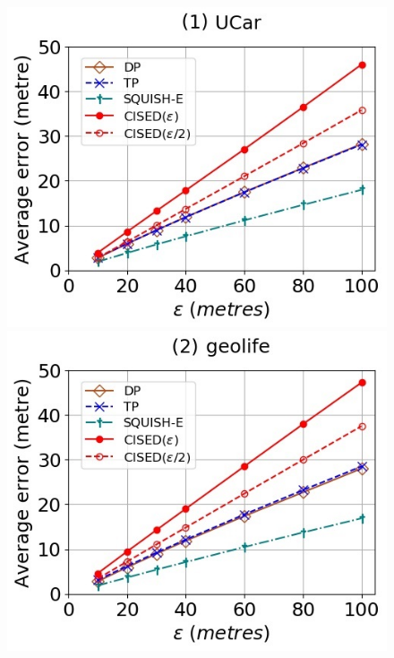 \begin{figure}[tb!]
	\centering
	\includegraphics[scale = 0.400]{Figures/Exp-where-SED-error-epsilon-service.jpg}\hspace{2ex}
	\includegraphics[scale = 0.400]{Figures/Exp-where-SED-error-epsilon-geolife.jpg}\hspace{2ex}

\end{figure}
